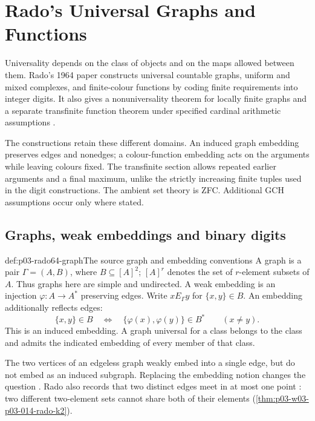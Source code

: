 \chapter{Rado's Universal Graphs and Functions}
\label{sec:p03-rado-1964}

Universality depends on the class of objects and on the maps allowed between
them. Rado's 1964 paper constructs universal countable graphs, uniform and
mixed complexes, and finite-colour functions by coding finite requirements
into integer digits. It also gives a nonuniversality theorem for locally finite
graphs and a separate transfinite function theorem under specified cardinal
arithmetic assumptions \cite[pp.~331--340]{Rado1964}.

The constructions retain these different domains. An induced graph embedding
preserves edges and nonedges; a colour-function embedding acts on the arguments
while leaving colours fixed. The transfinite section allows repeated earlier
arguments and a final maximum, unlike the strictly increasing finite tuples
used in the digit constructions. The ambient set theory is ZFC. Additional
GCH assumptions occur only where stated.

\section{Graphs, weak embeddings and binary digits}
\label{sec:p03-rado64-graphs}

\begin{hbdefinition}{def:p03-rado64-graph}{The source graph and embedding conventions}
A graph is a pair \(\Gamma=(A,B)\), where \(B\subseteq[A]^2\);
\([A]^r\) denotes the set of \(r\)-element subsets of \(A\).
Thus graphs here are simple and undirected. A weak embedding is an injection
\(\varphi:A\to A^*\) preserving edges. Write \(xE_\Gamma y\) for
\(\{x,y\}\in B\). An embedding additionally reflects
edges:
\[
 \{x,y\}\in B\quad\Longleftrightarrow\quad
       \{\varphi(x),\varphi(y)\}\in B^*\qquad(x\ne y).
\]
This is an induced embedding. A graph universal for a class belongs to the
class and admits the indicated embedding of every member of that class.
\end{hbdefinition}

The two vertices of an edgeless graph weakly embed into a single edge,
but do not embed as an induced subgraph. Replacing the embedding notion
changes the question \cite[1.1]{Rado1964}.
Rado also records that two distinct edges meet in at most one point
\cite[\S1.1, p.~331]{Rado1964}: two different two-element sets cannot
share both of their elements (\cref{thm:p03-w03-p03-014-rado-k2}).

